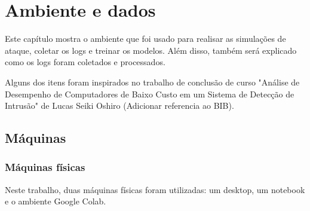 
\chapter{Ambiente e dados}
\label{cap:data}

Este capítulo mostra o ambiente que foi usado para realisar as simulações de ataque, coletar os logs e treinar os modelos.
Além disso, também será explicado como os logs foram coletados e processados.

Alguns dos itens foram inspirados no trabalho de conclusão de curso "Análise de Desempenho de Computadores de Baixo Custo em um Sistema de Detecção de Intrusão" de Lucas Seiki Oshiro (Adicionar referencia ao BIB).


\section{Máquinas}

\subsection{Máquinas físicas}

Neste trabalho, duas máquinas físicas foram utilizadas: um desktop, um notebook e o ambiente Google Colab. 

